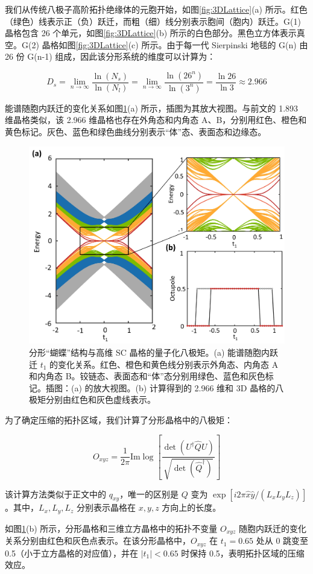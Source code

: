 我们从传统八极子高阶拓扑绝缘体的元胞开始，如图\ref{fig:3DLattice}(a) 所示。红色（绿色）线表示正（负）跃迁，而粗（细）线分别表示胞间（胞内）跃迁。G(1) 晶格包含 26 个单元，如图\ref{fig:3DLattice}(b) 所示的白色部分。黑色立方体表示真空。G(2) 晶格如图\ref{fig:3DLattice}(c) 所示。由于每一代 Sierpinski 地毯的 G(n) 由 26 份 G(n-1) 组成，因此该分形系统的维度可以计算为：

\begin{equation}
D_s = \lim_{n \to \infty} \frac{\ln (N_s)}{\ln (N_l)} = \lim_{n \to \infty} \frac{\ln (26^n)}{\ln (3^n)} = \frac{\ln 26}{\ln 3} \approx 2.966
\end{equation}

能谱随胞内跃迁的变化关系如图\ref{fig:3DSpec}(a) 所示，插图为其放大视图。与前文的 1.893 维晶格类似，该 2.966 维晶格也存在外角态和内角态 A、B，分别用红色、橙色和黄色标记。灰色、蓝色和绿色曲线分别表示“体”态、表面态和边缘态。
\begin{figure}[htbp]
    \centering
    \includegraphics[width=0.5\linewidth]{figure/HOTITheo/3DSpec.png}
    \caption{分形“蝴蝶”结构与高维 SC 晶格的量子化八极矩。(a) 能谱随胞内跃迁 \( t_1 \) 的变化关系。红色、橙色和黄色线分别表示外角态、内角态 A 和内角态 B。铰链态、表面态和“体”态分别用绿色、蓝色和灰色标记。插图：(a) 的放大视图。(b) 计算得到的 2.966 维和 3D 晶格的八极矩分别由红色和灰色虚线表示。}
    \label{fig:3DSpec}
\end{figure}
为了确定压缩的拓扑区域，我们计算了分形晶格中的八极矩：

\begin{equation}
O_{xyz} = \frac{1}{2\pi} \text{Im} \log \left[ \frac{\det \left( U^\dagger \hat{Q} U \right)}{\sqrt{\det \left(\hat{Q}^\dagger \right)}} \right]
\end{equation}

该计算方法类似于正文中的 \( q_{xy} \)，唯一的区别是 \( Q \) 变为 \( \exp[i2\pi \hat{x} \hat{y} / (L_x L_y L_z)] \)。其中，\( L_x, L_y, L_z \) 分别表示晶格在 \( x, y, z \) 方向上的长度。

如图\ref{fig:3DSpec}(b) 所示，分形晶格和三维立方晶格中的拓扑不变量 \( O_{xyz} \) 随胞内跃迁的变化关系分别由红色和灰色点表示。在该分形晶格中，\( O_{xyz} \) 在 \( t_1 = 0.65 \) 处从 0 跳变至 0.5（小于立方晶格的对应值），并在 \( |t_1| < 0.65 \) 时保持 0.5，表明拓扑区域的压缩效应。

